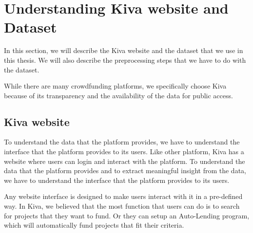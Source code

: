 \section{Understanding Kiva website and Dataset}

In this section, we will describe the Kiva website and the dataset that we use in this thesis.
We will also describe the preprocessing steps that we have to do with the dataset.

While there are many crowdfunding platforms,
we specifically choose Kiva because of its transparency and the availability of the data for public access.

\subsection{Kiva website}

To understand the data that the platform provides, we have to understand the interface that the platform provides to its users.
Like other platform, Kiva has a website where users can login and interact with the platform.
To understand the data that the platform provides and to extract meaningful insight from the data,
we have to understand the interface that the platform provides to its users.

Any website interface is designed to make users interact with it in a pre-defined way.
In Kiva, we believed that the most function that users can do is to search for projects that they want to fund.
Or they can setup an Auto-Lending program, which will automatically fund projects that fit their criteria.


